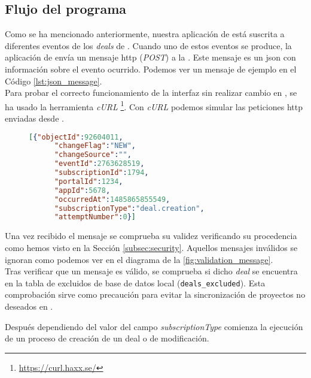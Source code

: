 


\subsection{Flujo del programa}

Como se ha mencionado anteriormente, nuestra aplicación de \hs{} está suscrita a diferentes eventos de los \textit{deals} de \hs{}.
Cuando uno de estos eventos se produce, la aplicación de \hs{} envía un mensaje \acrshort{http} (\textit{POST}) a la \iface{}. Este mensaje es un \acrshort{json} con información sobre el evento ocurrido. Podemos ver un mensaje de ejemplo en el Código \ref{lst:json_message}.\\

Para probar el correcto funcionamiento de la interfaz sin realizar cambio en \hs{}, se ha usado la herramienta \textit{cURL} \footnote{\url{https://curl.haxx.se/}}. 
Con \textit{cURL} podemos simular las peticiones \acrshort{http} enviadas desde \hs{}.

\begin{figure}
\begin{lstlisting}[caption={Ejemplo de mensaje recibido por la \iface{}},label={lst:json_message}, language=json]
	[{"objectId":92604011,
	  "changeFlag":"NEW",
	  "changeSource":"",
	  "eventId":2763628519,
	  "subscriptionId":1794,
	  "portalId":1234,
	  "appId":5678,
	  "occurredAt":1485865855549,
	  "subscriptionType":"deal.creation",
	  "attemptNumber":0}]
\end{lstlisting}
\end{figure}
 
Una vez recibido el mensaje se comprueba su validez verificando su procedencia como hemos visto en la Sección \ref{subsec:security}. Aquellos mensajes inválidos se ignoran como podemos ver en el diagrama de la \ref{fig:validation_message}.\\

Tras verificar que un mensaje es válido, se comprueba si dicho \textit{deal} se encuentra en la tabla de excluidos de base de datos local (\texttt{deals\_excluded}). 
Esta comprobación sirve como precaución para evitar la sincronización de proyectos no deseados en \wday{}.

Después dependiendo del valor del campo \textit{subscriptionType} comienza la ejecución de un proceso de creación de un deal o de modificación.

